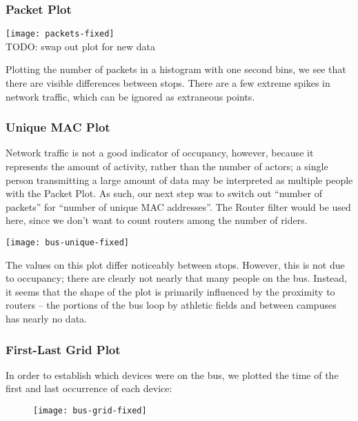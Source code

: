 \documentclass[12pt,journal,compsoc]{IEEEtran}
\begin{document}
	\subsubsection*{Packet Plot}
		\begin{figure*}[!t]
		\texttt{[image: packets-fixed]}
		\\TODO: swap out plot for new data
		\end{figure*}

		Plotting the number of packets in a histogram with one second bins, we see that there are visible differences between stops. %
		There are a few extreme spikes in network traffic, which can be ignored as extraneous points.

	\subsubsection*{Unique MAC Plot}

		Network traffic is not a good indicator of occupancy, however, because it represents the amount of activity, rather than the number of actors; a single person transmitting a large amount of data may be interpreted as multiple people with the Packet Plot.
		As such, our next step was to switch out ``number of packets'' for ``number of unique MAC addresses''.
		The Router filter would be used here, since we don't want to count routers among the number of riders.

		\begin{figure*}[!t]
		\texttt{[image: bus-unique-fixed]}
		\end{figure*}

		The values on this plot differ noticeably between stops.
		However, this is not due to occupancy; there are clearly not nearly that many people on the bus.
		Instead, it seems that the shape of the plot is primarily influenced by the proximity to routers -- the portions of the bus loop by athletic fields and between campuses has nearly no data.

	\subsubsection*{First-Last Grid Plot}
		In order to establish which devices were on the bus, we plotted the time of the first and last occurrence of each device:

		\begin{figure}[H]
		\texttt{[image: bus-grid-fixed]}
		\end{figure}
\end{document}
